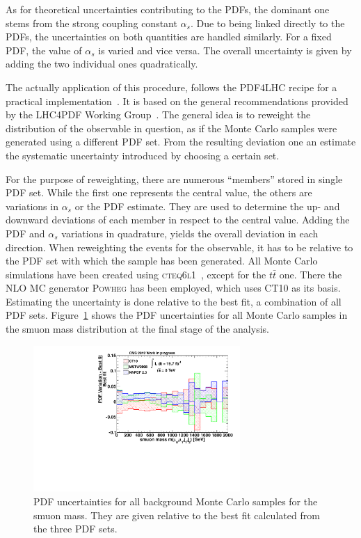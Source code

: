 As for theoretical uncertainties contributing to the PDFs, the dominant one stems from the strong coupling constant $\alpha_s$. Due to being linked directly to the PDFs, the uncertainties on both quantities are handled similarly. For a fixed PDF, the value of $\alpha_s$ is varied and vice versa. The overall uncertainty is given by adding the two individual ones quadratically.

The actually application of this procedure, follows the \textsc{PDF4LHC} recipe for a practical implementation~\cite{pdf4lhcpractical}. It is based on the general recommendations provided by the LHC4PDF Working Group~\cite{pdf4lhcrecom}. The general idea is to reweight the distribution of the observable in question, as if the Monte Carlo samples were generated using a different PDF set. From the resulting deviation one an estimate the systematic uncertainty introduced by choosing a certain set.

For the purpose of reweighting, there are numerous ``members'' stored in single PDF set. While the first one represents the central value, the others are variations in $\alpha_s$ or the PDF estimate. They are used to determine the up- and downward deviations of each member in respect to the central value. Adding the PDF and $\alpha_s$ variations in quadrature, yields the overall deviation in each direction. When reweighting the events for the observable, it has to be relative to the PDF set with which the sample has been generated. All Monte Carlo simulations have been created using \textsc{cteq6l1}~\cite{cteq6l1}, except for the $t\bar{t}$ one. There the NLO MC generator \textsc{Powheg} has been employed, which uses \textsc{CT10} as its basis. Estimating the uncertainty is done relative to the best fit, a combination of all PDF sets. Figure~\ref{fig:pdfsys} shows the PDF uncertainties for all Monte Carlo samples in the smuon mass distribution at the final stage of the analysis.

\begin{figure}[!htb]
  \centering
  \includegraphics[width=0.7\textwidth]{plots/pdfratios.pdf}
  \caption{PDF uncertainties for all background Monte Carlo samples for the smuon mass. They are given relative to the best fit calculated from the three PDF sets.}
  \label{fig:pdfsys}
\end{figure}

